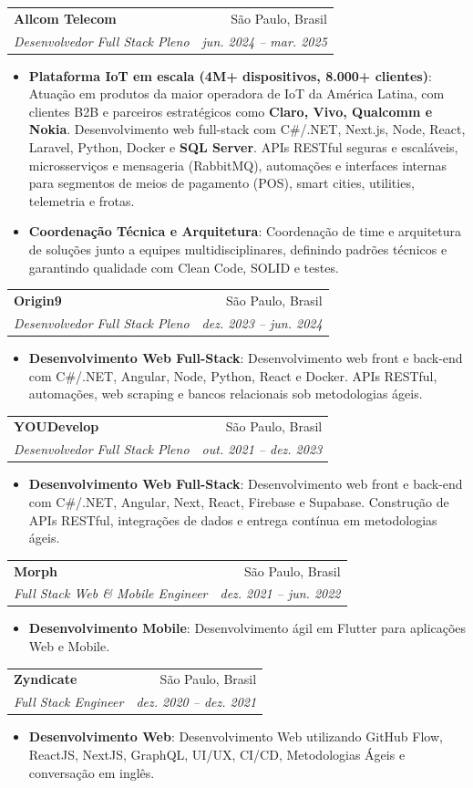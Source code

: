 \documentclass[letterpaper,11pt]{article}
\makeatletter
\newcommand{\resumeItem}[2]{
  \item\small{
    \textbf{#1}{: #2 \vspace{-2pt}}
  }
}
\newcommand{\resumeSubheading}[4]{
  \vspace{-1pt}\item
    \begin{tabular*}{0.97\textwidth}{l@{\extracolsep{\fill}}r}
      \textbf{#1} & #2 \\
      \textit{\small#3} & \textit{\small #4} \\
    \end{tabular*}\vspace{-5pt}
}
\newcommand{\resumeItemListStart}{\begin{itemize}}
\newcommand{\resumeItemListEnd}{\end{itemize}\vspace{-5pt}}
\makeatother
\begin{document}
    \resumeSubheading
      {Allcom Telecom}{São Paulo, Brasil}
      {Desenvolvedor Full Stack Pleno}{jun. 2024 -- mar. 2025}
      \resumeItemListStart
        \resumeItem{Plataforma IoT em escala (4M+ dispositivos, 8.000+ clientes)}
          {Atuação em produtos da maior operadora de IoT da América Latina, com clientes B2B e parceiros estratégicos como \textbf{Claro, Vivo, Qualcomm e Nokia}. Desenvolvimento web full-stack com C\#/.NET, Next.js, Node, React, Laravel, Python, Docker e \textbf{SQL Server}. APIs RESTful seguras e escaláveis, microsserviços e mensageria (RabbitMQ), automações e interfaces internas para segmentos de meios de pagamento (POS), smart cities, utilities, telemetria e frotas.}
        \resumeItem{Coordenação Técnica e Arquitetura}
          {Coordenação de time e arquitetura de soluções junto a equipes multidisciplinares, definindo padrões técnicos e garantindo qualidade com Clean Code, SOLID e testes.}
      \resumeItemListEnd

    \resumeSubheading
      {Origin9}{São Paulo, Brasil}
      {Desenvolvedor Full Stack Pleno}{dez. 2023 -- jun. 2024}
      \resumeItemListStart
        \resumeItem{Desenvolvimento Web Full-Stack}
          {Desenvolvimento web front e back-end com C\#/.NET, Angular, Node, Python, React e Docker. APIs RESTful, automações, web scraping e bancos relacionais sob metodologias ágeis.}
      \resumeItemListEnd

    \resumeSubheading
      {YOUDevelop}{São Paulo, Brasil}
      {Desenvolvedor Full Stack Pleno}{out. 2021 -- dez. 2023}
      \resumeItemListStart
        \resumeItem{Desenvolvimento Web Full-Stack}
          {Desenvolvimento web front e back-end com C\#/.NET, Angular, Next, React, Firebase e Supabase. Construção de APIs RESTful, integrações de dados e entrega contínua em metodologias ágeis.}
      \resumeItemListEnd

    \resumeSubheading
      {Morph}{São Paulo, Brasil}
      {Full Stack Web \& Mobile Engineer}{dez. 2021 -- jun. 2022}
      \resumeItemListStart
        \resumeItem{Desenvolvimento Mobile}
          {Desenvolvimento ágil em Flutter para aplicações Web e Mobile.}
      \resumeItemListEnd

    \resumeSubheading
      {Zyndicate}{São Paulo, Brasil}
      {Full Stack Engineer}{dez. 2020 -- dez. 2021}
      \resumeItemListStart
        \resumeItem{Desenvolvimento Web}
          {Desenvolvimento Web utilizando GitHub Flow, ReactJS, NextJS, GraphQL, UI/UX, CI/CD, Metodologias Ágeis e conversação em inglês.}
      \resumeItemListEnd
\end{document}
